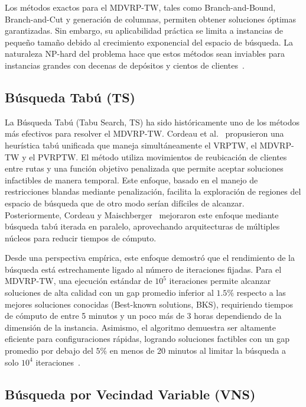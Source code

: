 \documentclass[letter, 10pt, dvipdfmx]{article}
\begin{document}
Los métodos exactos para el MDVRP-TW, tales como Branch-and-Bound, Branch-and-Cut y generación de columnas, permiten obtener soluciones óptimas garantizadas. Sin embargo,
su aplicabilidad práctica se limita a instancias de pequeño tamaño debido al crecimiento exponencial del espacio de búsqueda. La naturaleza NP-hard del problema
hace que estos métodos sean inviables para instancias grandes con decenas de depósitos y cientos de clientes~\cite{Tan2001}.

\subsection{Búsqueda Tabú (TS)}

La Búsqueda Tabú (Tabu Search, TS) ha sido históricamente uno de los métodos más efectivos para resolver el MDVRP-TW. Cordeau et al.~\cite{Cordeau2001} propusieron una heurística tabú unificada
que maneja simultáneamente el VRPTW, el MDVRP-TW y el PVRPTW. El método utiliza movimientos de reubicación de clientes entre rutas y una función objetivo penalizada que permite aceptar soluciones
infactibles de manera temporal. Este enfoque, basado en el manejo de restricciones blandas mediante penalización, facilita la exploración de regiones del espacio de búsqueda que de otro modo serían
difíciles de alcanzar. Posteriormente, Cordeau y Maischberger~\cite{Cordeau2012} mejoraron este enfoque
mediante búsqueda tabú iterada en paralelo, aprovechando arquitecturas de múltiples núcleos para reducir tiempos de cómputo.

Desde una perspectiva empírica, este enfoque demostró que el rendimiento de la búsqueda está estrechamente ligado al
número de iteraciones fijadas. Para el MDVRP-TW, una ejecución estándar de $10^5$ iteraciones permite alcanzar
soluciones de alta calidad con un gap promedio inferior al $1.5\%$ respecto a las mejores soluciones conocidas (Best-known solutions, BKS),
requiriendo tiempos de cómputo de entre 5 minutos y un poco más de 3 horas dependiendo de la dimensión
de la instancia. Asimismo, el algoritmo demuestra ser altamente eficiente para configuraciones rápidas, logrando
soluciones factibles con un gap promedio por debajo del $5\%$ en menos de 20 minutos al limitar la búsqueda a solo
$10^4$ iteraciones~\cite{Cordeau2012}.

\subsection{Búsqueda por Vecindad Variable (VNS)}
\end{document}
